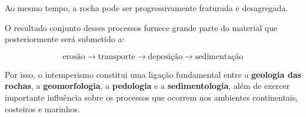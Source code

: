 Ao mesmo tempo, a rocha pode ser progressivamente fraturada e desagregada.

O resultado conjunto desses processos fornece grande parte do material que posteriormente será submetido a:

\[
\boxed{
\text{erosão}
\rightarrow
\text{transporte}
\rightarrow
\text{deposição}
\rightarrow
\text{sedimentação}
}
\]

Por isso, o intemperismo constitui uma ligação fundamental entre a \textbf{geologia das rochas}, a \textbf{geomorfologia}, a \textbf{pedologia} e a \textbf{sedimentologia}, além de exercer importante influência sobre os processos que ocorrem nos ambientes continentais, costeiros e marinhos.


